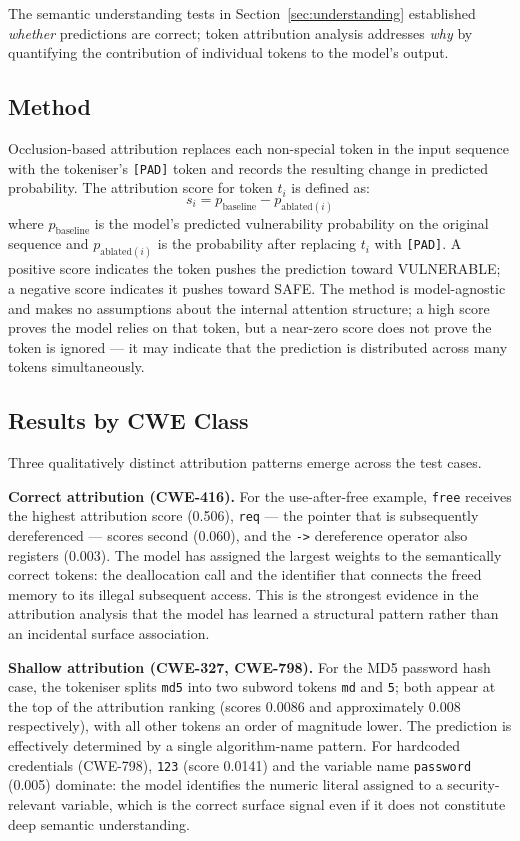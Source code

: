 The semantic understanding tests in Section~\ref{sec:understanding} established
\textit{whether} predictions are correct; token attribution analysis addresses
\textit{why} by quantifying the contribution of individual tokens to the model's output.

\subsection{Method}

Occlusion-based attribution replaces each non-special token in the input sequence with
the tokeniser's \texttt{[PAD]} token and records the resulting change in predicted
probability.
The attribution score for token $t_i$ is defined as:
\[
  s_i = p_{\text{baseline}} - p_{\text{ablated}(i)}
\]
where $p_{\text{baseline}}$ is the model's predicted vulnerability probability on the
original sequence and $p_{\text{ablated}(i)}$ is the probability after replacing $t_i$
with \texttt{[PAD]}.
A positive score indicates the token pushes the prediction toward VULNERABLE; a negative
score indicates it pushes toward SAFE.
The method is model-agnostic and makes no assumptions about the internal attention
structure; a high score proves the model relies on that token, but a near-zero score
does not prove the token is ignored --- it may indicate that the prediction is
distributed across many tokens simultaneously.

\subsection{Results by CWE Class}

Three qualitatively distinct attribution patterns emerge across the test cases.

\textbf{Correct attribution (CWE-416).}
For the use-after-free example, \texttt{free} receives the highest attribution score
(0.506), \texttt{req} --- the pointer that is subsequently dereferenced --- scores
second (0.060), and the \texttt{->} dereference operator also registers (0.003).
The model has assigned the largest weights to the semantically correct tokens: the
deallocation call and the identifier that connects the freed memory to its illegal
subsequent access.
This is the strongest evidence in the attribution analysis that the model has learned a
structural pattern rather than an incidental surface association.

\textbf{Shallow attribution (CWE-327, CWE-798).}
For the MD5 password hash case, the tokeniser splits \texttt{md5} into two subword
tokens \texttt{md} and \texttt{5}; both appear at the top of the attribution ranking
(scores 0.0086 and approximately 0.008 respectively), with all other tokens an order of
magnitude lower.
The prediction is effectively determined by a single algorithm-name pattern.
For hardcoded credentials (CWE-798), \texttt{123} (score 0.0141) and the variable name
\texttt{password} (0.005) dominate: the model identifies the numeric literal assigned to
a security-relevant variable, which is the correct surface signal even if it does not
constitute deep semantic understanding.

